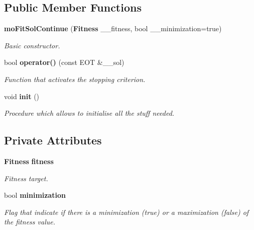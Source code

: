 \subsection*{Public Member Functions}
\begin{CompactItemize}
\item 
{\bf moFitSolContinue} ({\bf Fitness} \_\-\_\-fitness, bool \_\-\_\-minimization=true)
\begin{CompactList}\small\item\em Basic constructor. \item\end{CompactList}\item 
bool {\bf operator()} (const EOT \&\_\-\_\-sol)
\begin{CompactList}\small\item\em Function that activates the stopping criterion. \item\end{CompactList}\item 
void {\bf init} ()\label{classmo_fit_sol_continue_670bd895b4edfcd3aebb40d2295d7f7c}

\begin{CompactList}\small\item\em Procedure which allows to initialise all the stuff needed. \item\end{CompactList}\end{CompactItemize}
\subsection*{Private Attributes}
\begin{CompactItemize}
\item 
{\bf Fitness} {\bf fitness}\label{classmo_fit_sol_continue_87d0ba8f2f76f61c89317eed5f094dfc}

\begin{CompactList}\small\item\em Fitness target. \item\end{CompactList}\item 
bool {\bf minimization}
\begin{CompactList}\small\item\em Flag that indicate if there is a minimization (true) or a maximization (false) of the fitness value. \item\end{CompactList}\end{CompactItemize}


